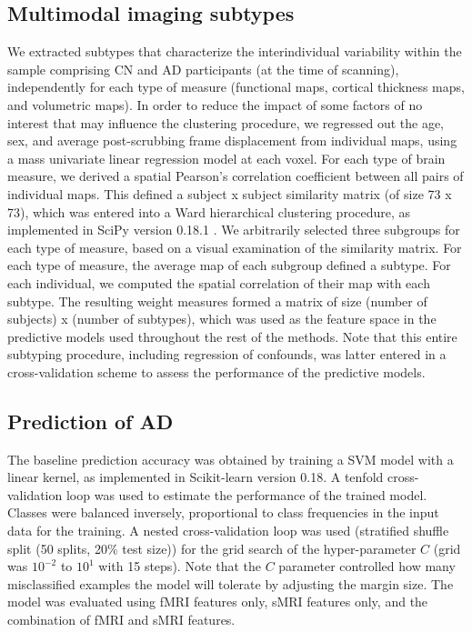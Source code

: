 \documentclass[authoryear]{elsarticle}
\begin{document}
\subsection*{Multimodal imaging subtypes}
We extracted subtypes that characterize the interindividual variability within the sample comprising CN and AD participants (at the time of scanning), independently for each type of measure (functional maps, cortical thickness maps, and volumetric maps). In order to reduce the impact of some factors of no interest that may influence the clustering procedure, we regressed out the age, sex, and average post-scrubbing frame displacement from individual maps, using a mass univariate linear regression model at each voxel. For each type of brain measure, we derived a spatial Pearson's correlation coefficient between all pairs of individual maps. This defined a subject x subject similarity matrix (of size 73 x 73), which was entered into a Ward hierarchical clustering procedure, as implemented in SciPy version 0.18.1 \citep{scipy,Walt2011numpy}. We arbitrarily selected three subgroups for each type of measure, based on a visual examination of the similarity matrix. For each type of measure, the average map of each subgroup defined a subtype. For each individual, we computed the spatial correlation of their map with each subtype. The resulting weight measures formed a matrix of size (number of subjects) x (number of subtypes), which was used as the feature space in the predictive models used throughout the rest of the methods. Note that this entire subtyping procedure, including regression of confounds, was latter entered in a cross-validation scheme to assess the performance of the predictive models. 
\subsection*{Prediction of AD}
The baseline prediction accuracy was obtained by training a SVM model with a linear kernel, as implemented in Scikit-learn \cite{scikit-learn} version 0.18. A tenfold cross-validation loop was used to estimate the performance of the trained model. Classes were balanced inversely, proportional to class frequencies in the input data for the training. A nested cross-validation loop was used (stratified shuffle split (50 splits, 20\% test size)) for the grid search of the hyper-parameter $C$ (grid was $10^{-2}$ to $10^{1}$ with 15 steps). Note that the $C$ parameter controlled how many misclassified examples the model will tolerate by adjusting the margin size. The model was evaluated using fMRI features only, sMRI features only, and the combination of fMRI and sMRI features. 
\end{document}
